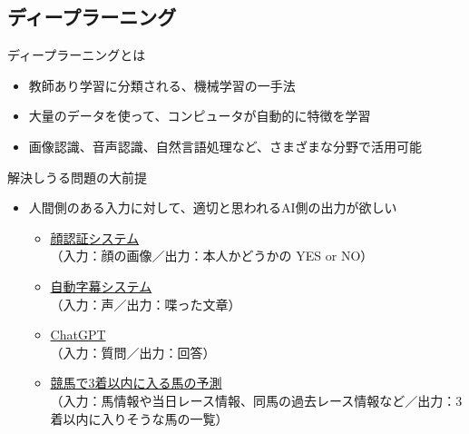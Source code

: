 \documentclass[dvipdfmx,aspectratio=169]{beamer}
\begin{document}
	\subsection{ディープラーニング}
	\begin{frame}{ディープラーニングとは}
		\begin{itemize}
			\item 教師あり学習に分類される、機械学習の一手法
			\item 大量のデータを使って、コンピュータが自動的に特徴を学習
			\item 画像認識、音声認識、自然言語処理など、さまざまな分野で活用可能
		\end{itemize}
	\end{frame}
	
	\begin{frame}{解決しうる問題の大前提}
		\begin{itemize}
			\item 人間側のある入力に対して、適切と思われるAI側の出力が欲しい
			\begin{itemize}
				\item \underline{顔認証システム}\\（入力：顔の画像／出力：本人かどうかの YES or NO）
				\item \underline{自動字幕システム}\\（入力：声／出力：喋った文章）
				\item \underline{ChatGPT}\\（入力：質問／出力：回答）
				\item \underline{競馬で3着以内に入る馬の予測}\\（入力：馬情報や当日レース情報、同馬の過去レース情報など／出力：3着以内に入りそうな馬の一覧）
			\end{itemize}
		\end{itemize}
	\end{frame}
	
\end{document}
